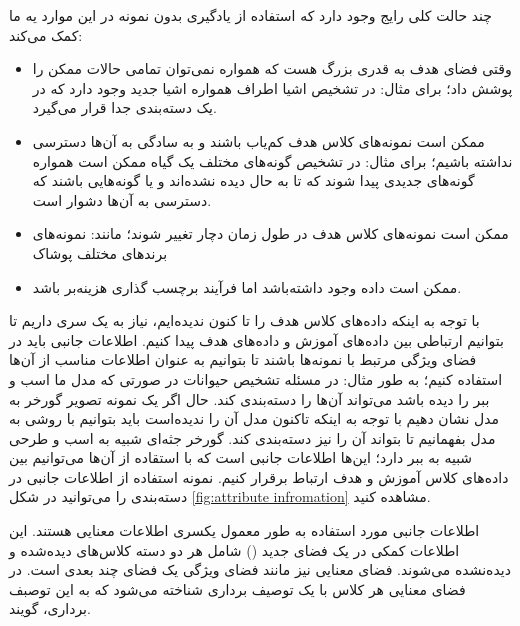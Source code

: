چند حالت کلی رایج وجود دارد که استفاده از یادگیری بدون نمونه در این موارد یه ما کمک می‌کند:
\begin{itemize}
    \item
    وقتی فضای هدف به قدری بزرگ هست که همواره نمی‌توان تمامی حالات ممکن را پوشش داد؛ برای مثال: در تشخیص اشيا اطراف همواره اشیا جدید وجود دارد که در یک دسته‌بندی جدا قرار می‌گیرد.
    \item
    ممکن است نمونه‌های کلاس هدف کم‌یاب باشند و به سادگی به آن‌ها دسترسی نداشته باشیم؛ برای مثال: در تشخیص گونه‌های مختلف یک گیاه ممکن است همواره گونه‌های جدیدی پیدا شوند که تا به حال دیده نشده‌اند و یا گونه‌هایی باشند که دسترسی به آن‌ها دشوار است.
    \item
    ممکن است نمونه‌های کلاس هدف در طول زمان دچار تغییر شوند؛ مانند: نمونه‌های برند‌های مختلف پوشاک
    \item
    ممکن است داده وجود داشته‌باشد اما فرآیند برچسب گذاری هزینه‌بر باشد.
\end{itemize}

با توجه به اینکه داده‌های کلاس هدف را تا کنون ندیده‌ایم، نیاز به یک سری
داریم تا بتوانیم ارتباطی بین داده‌های آموزش و داده‌های هدف پیدا کنیم. اطلاعات جانبی باید در فضای ویژگی مرتبط با نمونه‌ها باشند تا بتوانیم به عنوان اطلاعات مناسب از آن‌ها استفاده کنیم؛ به طور مثال: در مسئله تشخیص حیوانات در صورتی که مدل ما اسب و ببر را دیده باشد می‌تواند آن‌ها را دسته‌بندی کند. حال اگر یک نمونه تصویر گورخر به مدل نشان دهیم با توجه به اینکه تاکنون مدل آن‌ را ندیده‌است باید بتوانیم با روشی به مدل بفهمانیم تا بتواند آن را نیز دسته‌بندی کند. گورخر جثه‌ای شبیه به اسب و طرحی شبیه به ببر دارد؛ این‌ها اطلاعات جانبی است که با استقاده از آن‌ها می‌توانیم بین داده‌های کلاس آموزش و هدف ارتباط برقرار کنیم. نمونه استفاده از اطلاعات جانبی در دسته‌بندی را می‌توانید در شکل
\ref{fig:attribute infromation}
مشاهده کنید.

اطلاعات جانبی مورد استفاده به طور معمول یکسری اطلاعات معنایی هستند. این اطلاعات کمکی در یک فضای جدید
()
شامل هر دو دسته کلاس‌های دیده‌شده و دیده‌نشده می‌شوند. فضای معنایی نیز مانند فضای ویژگی یک فضای چند بعدی است. در فضای معنایی هر کلاس با یک توصیف برداری شناخته می‌شود که به این توصبف برداری،
گویند.


